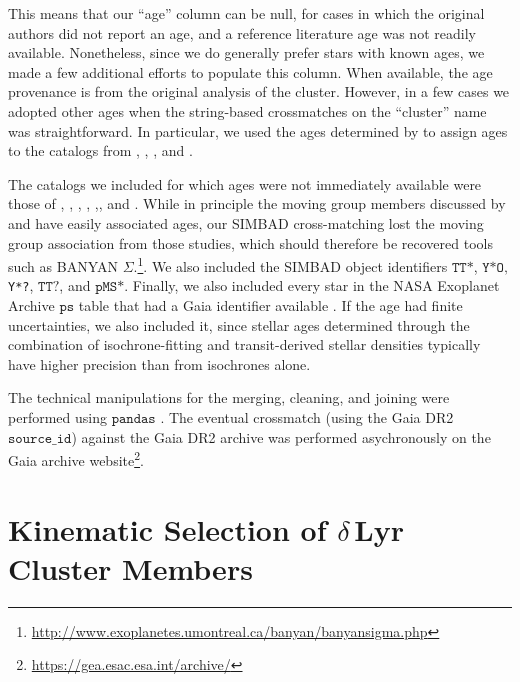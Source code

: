 \documentclass[12pt,modern,tighten]{aastex63}
\begin{document}
This means that our ``age'' column can be null, for cases in which the
original authors did not report an age, and a reference literature age
was not readily available.  Nonetheless, since we do generally prefer
stars with known ages, we made a few additional efforts to populate
this column.  When available, the age provenance is from the original
analysis of the cluster.  However, in a few cases we adopted other
ages when the string-based crossmatches on the ``cluster'' name was
straightforward.  In particular, we used the ages determined by
\citet{CantatGaudin2020b} to assign ages to the catalogs from
\citet{GaiaCollaboration2018}, \citet{CantatGaudin2018a},
\citet{CastroGinard2020}, and \citet{CantatGaudin2020a}.

The catalogs we included for which ages were not immediately available
were those of \citet{CottenSong2016}, \citet{Oh2017},
\citet{Zari2018}, \citet{Gagne2018a},
\citet{Gagne2018b},\citet{Gagne2018c}, and \citet{Ujjwal2020}.  While
in principle the moving group members discussed by
\citet{Gagne2018a,Gagne2018b,Gagne2018c} and \citet{Ujjwal2020} have
easily associated ages, our SIMBAD cross-matching lost the moving
group association from those studies, which should therefore be
recovered tools such as BANYAN
$\Sigma$.\footnote{\url{http://www.exoplanetes.umontreal.ca/banyan/banyansigma.php}}.
We also included the SIMBAD object identifiers $\texttt{TT*}$,
$\texttt{Y*O}, $\texttt{Y*?}, $\texttt{TT?}$, and $\texttt{pMS*}$.
Finally, we also included every star in the NASA Exoplanet Archive
$\texttt{ps}$ table that had a Gaia identifier available
\citep{NASAExoArchive_ps_20210506}.  If the age had finite
uncertainties, we also included it, since stellar ages determined
through the combination of isochrone-fitting and transit-derived
stellar densities typically have higher precision than from isochrones
alone.

The technical manipulations for the merging, cleaning, and joining
were performed using $\texttt{pandas}$
\citep{mckinney-proc-scipy-2010}.  The eventual crossmatch (using the
Gaia DR2 $\texttt{source\_id}$) against the Gaia DR2 archive was performed
asychronously on the Gaia archive
website\footnote{\url{https://gea.esac.esa.int/archive/}}.


\section{Kinematic Selection of $\delta$\,Lyr Cluster Members}
\end{document}
